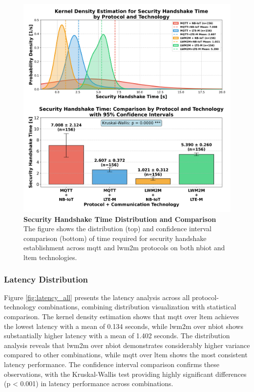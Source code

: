 \documentclass[12pt, english, openany]{book}
\begin{document}
\begin{figure}[htbp]
    \centering
    \includegraphics[width=1.0\textwidth]{handshake_time_all_protocol_tech_kde_ci.png}
    \caption{\textbf{Security Handshake Time Distribution and Comparison} \\ The figure shows the distribution (top) and confidence interval comparison (bottom) of time required for security handshake establishment across \gls{mqtt} and \gls{lwm2m} protocols on both \gls{nbiot} and \gls{ltem} technologies.}
    \label{fig:handshake_time_all}
\end{figure}
\FloatBarrier
\subsubsection*{Latency Distribution} \label{sec:latency_analysis}

Figure \ref{fig:latency_all} presents the latency analysis across all protocol-technology combinations, combining distribution visualization with statistical comparison. The kernel density estimation shows that \gls{mqtt} over \gls{ltem} achieves the lowest latency with a mean of 0.134 seconds, while \gls{lwm2m} over \gls{nbiot} shows substantially higher latency with a mean of 1.402 seconds. The distribution analysis reveals that \gls{lwm2m} over \gls{nbiot} demonstrates considerably higher variance compared to other combinations, while \gls{mqtt} over \gls{ltem} shows the most consistent latency performance. The confidence interval comparison confirms these observations, with the Kruskal-Wallis test providing highly significant differences (p < 0.001) in latency performance across combinations.
\end{document}
